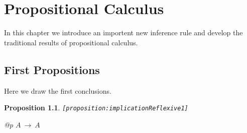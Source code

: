 \documentclass[a4paper,german,10pt,twoside]{book}
\newtheorem{prop}[thm]{Proposition}
\theoremstyle{definition}
\theoremstyle{remark}
\begin{document}

\chapter{Propositional Calculus} \label{chapter4} \hypertarget{chapter4}{}

In this chapter we introduce an importent new inference rule and develop the traditional results of propositional calculus.

\section{First Propositions} \label{chapter4_section1} \hypertarget{chapter4_section1}{}
Here we draw the first conclusions.

\begin{prop}
\label{proposition:implicationReflexive1} \hypertarget{proposition:implicationReflexive1}{}
{\tt \tiny [\verb]proposition:implicationReflexive1]]}
\mbox{}
\begin{longtable}{{@{\extracolsep{\fill}}p{\linewidth}}}
\centering $A\ \rightarrow\ A$
\end{longtable}

\end{prop}
\end{document}
